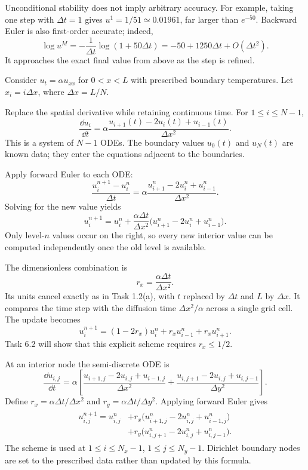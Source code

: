 Unconditional stability does not imply arbitrary accuracy. For example, taking one step with
$\Delta t=1$ gives $u^1=1/51\simeq0.01961$, far larger than $e^{-50}$.
Backward Euler is also first-order accurate; indeed,
\[
\log u^M=-\frac{1}{\Delta t}\log(1+50\Delta t)
=-50+1250\Delta t+O(\Delta t^2).
\]
It approaches the exact final value from above as the step is refined.

Consider $u_t=\alpha u_{xx}$ for $0<x<L$ with prescribed boundary temperatures.
Let $x_i=i\Delta x$, where $\Delta x=L/N$.

Replace the spatial derivative while retaining continuous time. For $1\le i\le N-1$,
\[
\boxed{\frac{\dd u_i}{\dd t}
=\alpha\frac{u_{i+1}(t)-2u_i(t)+u_{i-1}(t)}{\Delta x^2}.}
\]
This is a system of $N-1$ ODEs. The boundary values $u_0(t)$ and $u_N(t)$ are known data;
they enter the equations adjacent to the boundaries.

Apply forward Euler to each ODE:
\[
\frac{u_i^{n+1}-u_i^n}{\Delta t}
=\alpha\frac{u_{i+1}^n-2u_i^n+u_{i-1}^n}{\Delta x^2}.
\]
Solving for the new value yields
\[
\boxed{u_i^{n+1}=u_i^n+
\frac{\alpha\Delta t}{\Delta x^2}
\bigl(u_{i+1}^n-2u_i^n+u_{i-1}^n\bigr).}
\]
Only level-$n$ values occur on the right, so every new interior value can be computed
independently once the old level is available.

The dimensionless combination is
\[
\boxed{r_x=\frac{\alpha\Delta t}{\Delta x^2}.}
\]
Its units cancel exactly as in Task 1.2(a), with $t$ replaced by $\Delta t$ and $L$ by
$\Delta x$. It compares the time step with the diffusion time $\Delta x^2/\alpha$
across a single grid cell. The update becomes
\[
u_i^{n+1}=(1-2r_x)u_i^n+r_xu_{i-1}^n+r_xu_{i+1}^n.
\]
Task 6.2 will show that this explicit scheme requires $r_x\le1/2$.

At an interior node the semi-discrete ODE is
\[
\frac{\dd u_{i,j}}{\dd t}
=\alpha\left[
\frac{u_{i+1,j}-2u_{i,j}+u_{i-1,j}}{\Delta x^2}
+\frac{u_{i,j+1}-2u_{i,j}+u_{i,j-1}}{\Delta y^2}\right].
\]
Define $r_x=\alpha\Delta t/\Delta x^2$ and $r_y=\alpha\Delta t/\Delta y^2$.
Applying forward Euler gives
\begin{align*}
\boxed{\begin{aligned}
u_{i,j}^{n+1}=u_{i,j}^n
&+r_x\bigl(u_{i+1,j}^n-2u_{i,j}^n+u_{i-1,j}^n\bigr)\\
&+r_y\bigl(u_{i,j+1}^n-2u_{i,j}^n+u_{i,j-1}^n\bigr).
\end{aligned}}
\end{align*}
The scheme is used at $1\le i\le N_x-1$, $1\le j\le N_y-1$.
Dirichlet boundary nodes are set to the prescribed data rather than updated by this formula.

